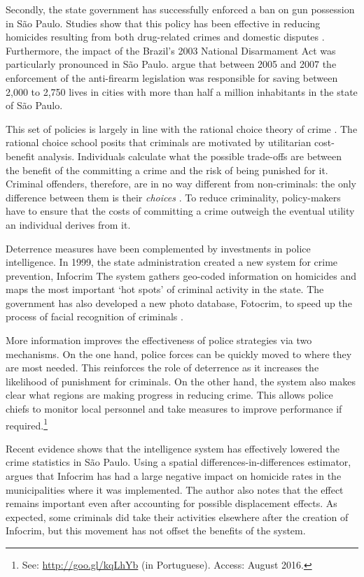 Secondly, the state government has successfully enforced a ban on gun possession in São Paulo. Studies show that this policy has been effective in reducing homicides resulting from both drug-related crimes and domestic disputes \citep{goertzel2009, kahn2005papel}. Furthermore, the impact of the Brazil's 2003 National Disarmament Act was particularly pronounced in São Paulo. \citet{cerqueira2013evaluating} argue that between 2005 and 2007 the enforcement of the anti-firearm legislation was responsible for saving between 2,000 to 2,750 lives in cities with more than half a million inhabitants in the state of São Paulo. 

This set of policies is largely in line with the rational choice theory of crime \citep[e.g.][]{becker1968crime, ehrlich1973participation,levitt1996effect, levitt1997using, paternoster2010much}. The rational choice school posits that criminals are motivated by utilitarian cost-benefit analysis. Individuals calculate what the possible trade-offs are between the benefit of the committing a crime and the risk of being punished for it. Criminal offenders, therefore, are in no way different from non-criminals: the only difference between them is their \emph{choices} \citep{nagin2007moving}. To reduce criminality, policy-makers have to ensure that the costs of committing a crime outweigh the eventual utility an individual derives from it.

Deterrence measures have been complemented by investments in police intelligence. In 1999, the state administration created a new system for crime prevention, Infocrim \citep[3]{risso2014intentional} The system gathers geo-coded information on homicides and maps the most important `hot spots' of criminal activity in the state. The government has also developed a new photo database, Fotocrim, to speed up the process of facial recognition of criminals \citep[3]{mello2010}. 

More information improves the effectiveness of police strategies via two mechanisms. On the one hand, police forces can be quickly moved to where they are most needed. This reinforces the role of deterrence as it increases the likelihood of punishment for criminals. On the other hand, the system also makes clear what regions are making progress in reducing crime. This allows police chiefs to monitor local personnel and take measures to improve performance if required.\footnote{See: \url{http://goo.gl/kqLhYb} (in Portuguese). Access: August 2016.} 

Recent evidence shows that the intelligence system has effectively lowered the crime statistics in São Paulo. Using a spatial differences-in-differences estimator, \citet{cabral2016infocrim} argues that Infocrim has had a large negative impact on homicide rates in the municipalities where it was implemented. The author also notes that the effect remains important even after accounting for possible displacement effects. As expected, some criminals did take their activities elsewhere after the creation of Infocrim, but this movement has not offset the benefits of the system.

